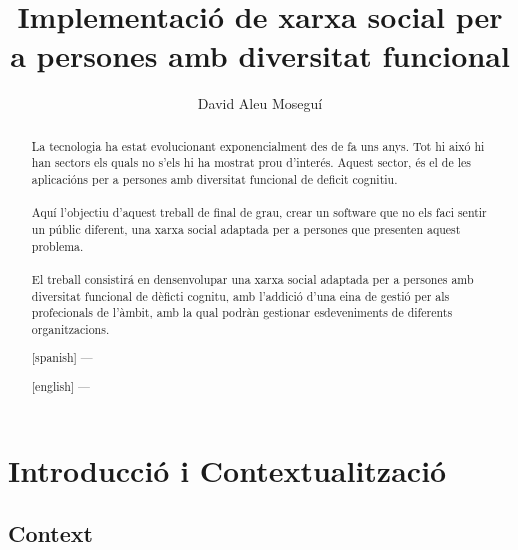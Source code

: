\documentclass[11pt,catalan,listoffigures,listoftables]{tfgetsinf}
\title{Implementació de xarxa social per a persones amb diversitat funcional}
\author{David Aleu Moseguí}
\begin{document}

\begin{abstract}
\noindent La tecnologia ha estat evolucionant exponencialment des de fa uns anys. Tot hi aixó hi han sectors els quals no s'els hi ha mostrat prou d'interés. Aquest sector, és el de les aplicacións per a persones amb diversitat funcional de deficit cognitiu.\\ \\
Aquí l'objectiu d'aquest treball de final de grau, crear un software que no els faci sentir un públic diferent, una xarxa social adaptada per a persones que presenten aquest problema.\\ \\
El treball consistirá en densenvolupar una xarxa social adaptada per a persones amb diversitat funcional de dèficti cognitu, amb l'addició d'una eina de gestió per als profecionals de l'àmbit, amb la qual podràn gestionar esdeveniments de diferents organitzacions.
\end{abstract}
\begin{abstract}[spanish]
---
\end{abstract}
\begin{abstract}[english]
---
\end{abstract}


\mainmatter


\chapter{Introducció i Contextualització}

\section{Context}
\end{document}
